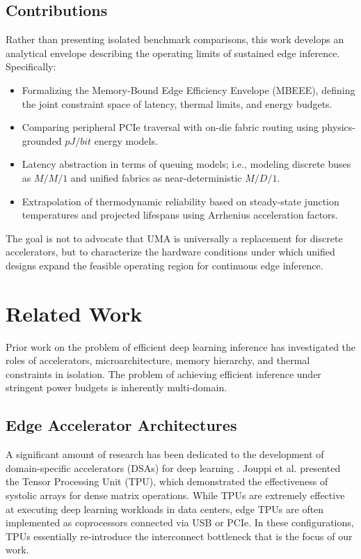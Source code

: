 \documentclass[conference]{IEEEtran}
\begin{document}
\subsection{Contributions}
Rather than presenting isolated benchmark comparisons, this work develops an analytical envelope describing the operating limits of sustained edge inference. Specifically:
\begin{itemize}
    \item Formalizing the Memory-Bound Edge Efficiency Envelope (MBEEE), defining the joint constraint space of latency, thermal limits, and energy budgets.
    \item Comparing peripheral PCIe traversal with on-die fabric routing using physics-grounded $pJ/bit$ energy models.
    \item Latency abstraction in terms of queuing models; i.e., modeling discrete buses as $M/M/1$ and unified fabrics as near-deterministic $M/D/1$.
    \item Extrapolation of thermodynamic reliability based on steady-state junction temperatures and projected lifespans using Arrhenius acceleration factors.
\end{itemize}
The goal is not to advocate that UMA is universally a replacement for discrete accelerators, but to characterize the hardware conditions under which unified designs expand the feasible operating region for continuous edge inference.

\section{Related Work}

Prior work on the problem of efficient deep learning inference has investigated the roles of accelerators, microarchitecture, memory hierarchy, and thermal constraints in isolation. The problem of achieving efficient inference under stringent power budgets is inherently multi-domain.

\subsection{Edge Accelerator Architectures}
A significant amount of research has been dedicated to the development of domain-specific accelerators (DSAs) for deep learning \cite{b1}. Jouppi et al. \cite{b_tpu} presented the Tensor Processing Unit (TPU), which demonstrated the effectiveness of systolic arrays for dense matrix operations. While TPUs are extremely effective at executing deep learning workloads in data centers, edge TPUs are often implemented as coprocessors connected via USB or PCIe. In these configurations, TPUs essentially re-introduce the interconnect bottleneck that is the focus of our work.
\end{document}
